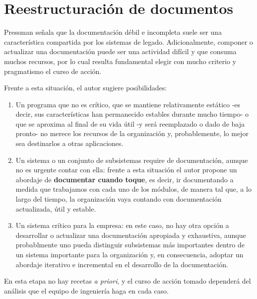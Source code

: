 \section{Reestructuración de documentos}

Pressman señala que la documentación débil e incompleta suele ser una
característica compartida por los sistemas de legado.
Adicionalmente, componer o actualizar una documentación puede ser una actividad 
difícil y que consuma muchos recursos,
por lo cual resulta fundamental elegir con mucho criterio y pragmatismo el 
curso de acción.

Frente a esta situación, el autor sugiere posibilidades:
\begin{enumerate}
    \item Un programa que no es crítico, que se mantiene relativamente estático
    -es decir, sus características han permanecido estables durante mucho tiempo-
    o que se aproxima al final de su vida útil -y será reemplazado o dado de baja pronto-
    no merece los recursos de la organización y, probablemente, lo mejor sea 
    destinarlos a otras aplicaciones.
    \item Un sistema o un conjunto de subsistemas require de documentación,
    aunque no es urgente contar con ella: frente a esta situación el autor 
    propone un abordaje de \textbf{documentar cuando toque}, es decir,
    ir documentando a medida que trabajamos con cada uno de los módulos,
    de manera tal que, a lo largo del tiempo, la organización vaya 
    contando con documentación actualizada, útil y estable.
    \item Un sistema crítico para la empresa: en este caso, no hay otra opción a 
    desarrollar o actualizar una documentación apropiada y exhaustiva,
    aunque probablmente uno pueda distinguir subsistemas más importantes dentro 
    de un sistema importante para la organización y, en consecuencia,
    adoptar un abordaje iterativo e incremental en el desarrollo de la 
    documentación.
\end{enumerate}

En esta etapa no hay recetas \textit{a priori}, 
y el curso de acción tomado dependerá del análisis 
que el equipo de ingeniería haga en cada caso.